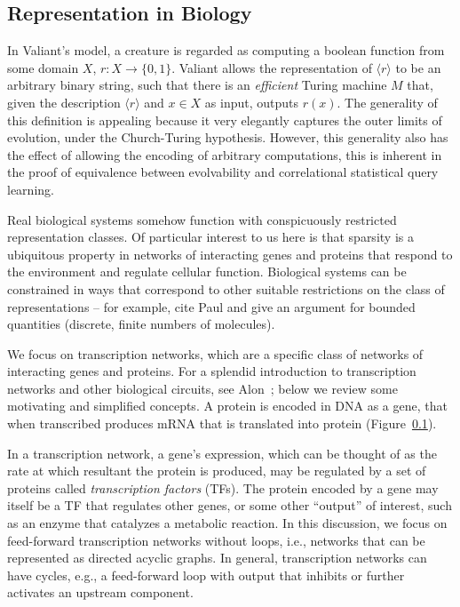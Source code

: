 \subsection{Representation in Biology}

In Valiant's model, a creature is regarded as computing a boolean function from
some domain $X$, $r : X \rightarrow \{0, 1\}$. Valiant allows the representation
of $\langle r \rangle$ to be an arbitrary binary string, such that there is an
\emph{efficient} Turing machine $M$ that, given the description $\langle r
\rangle$ and $x \in X$ as input, outputs $r(x)$. The generality of this
definition is appealing because it very elegantly captures the outer limits of
evolution, under the Church-Turing hypothesis. However, this generality also has
the effect of allowing the encoding of arbitrary computations, this is
inherent in the proof of equivalence between evolvability and correlational
statistical query learning.

Real biological systems somehow function with conspicuously restricted
representation classes. Of particular interest to us here is that sparsity is a
ubiquitous property in networks of interacting genes and proteins that respond
to the environment and regulate cellular function.
Biological systems can be constrained in ways that correspond to other suitable
restrictions on the class of representations -- for example, cite Paul and give
an argument for bounded quantities (discrete, finite numbers of molecules).

We focus on transcription networks, which are a specific class of
networks of interacting genes and proteins. For a splendid introduction to
transcription networks and other biological circuits, see Alon~\cite{alon};
below we review some motivating and simplified concepts.
A protein is encoded in DNA as a gene, that when transcribed produces mRNA
that is translated into protein (Figure~\ref{}).


In a transcription network, a gene's expression, which can be
thought of as the rate at which resultant the protein is produced,
may be regulated by a set of proteins called \emph{transcription factors} (TFs).
The protein encoded by a gene may itself be a TF that regulates other genes,
or some other ``output'' of interest, such as an enzyme that catalyzes a
metabolic reaction.
In this discussion, we focus on feed-forward transcription networks without
loops, i.e., networks that can be represented as directed acyclic graphs.
In general, transcription networks can have cycles, e.g., a feed-forward loop
with output that inhibits or further activates an upstream component.

